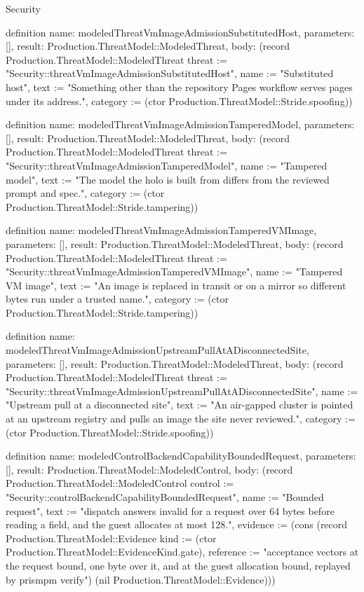\begin{lexlean}{Security}
\begin{semanticmodule}
definition{
  name: modeledThreatVmImageAdmissionSubstitutedHost,
  parameters: [],
  result: Production.ThreatModel::ModeledThreat,
  body: (record Production.ThreatModel::ModeledThreat {threat := "Security::threatVmImageAdmissionSubstitutedHost", name := "Substituted host", text := "Something other than the repository Pages workflow serves pages under its address.", category := (ctor Production.ThreatModel::Stride.spoofing)})
}

definition{
  name: modeledThreatVmImageAdmissionTamperedModel,
  parameters: [],
  result: Production.ThreatModel::ModeledThreat,
  body: (record Production.ThreatModel::ModeledThreat {threat := "Security::threatVmImageAdmissionTamperedModel", name := "Tampered model", text := "The model the holo is built from differs from the reviewed prompt and spec.", category := (ctor Production.ThreatModel::Stride.tampering)})
}

definition{
  name: modeledThreatVmImageAdmissionTamperedVMImage,
  parameters: [],
  result: Production.ThreatModel::ModeledThreat,
  body: (record Production.ThreatModel::ModeledThreat {threat := "Security::threatVmImageAdmissionTamperedVMImage", name := "Tampered VM image", text := "An image is replaced in transit or on a mirror so different bytes run under a trusted name.", category := (ctor Production.ThreatModel::Stride.tampering)})
}

definition{
  name: modeledThreatVmImageAdmissionUpstreamPullAtADisconnectedSite,
  parameters: [],
  result: Production.ThreatModel::ModeledThreat,
  body: (record Production.ThreatModel::ModeledThreat {threat := "Security::threatVmImageAdmissionUpstreamPullAtADisconnectedSite", name := "Upstream pull at a disconnected site", text := "An air-gapped cluster is pointed at an upstream registry and pulls an image the site never reviewed.", category := (ctor Production.ThreatModel::Stride.spoofing)})
}

definition{
  name: modeledControlBackendCapabilityBoundedRequest,
  parameters: [],
  result: Production.ThreatModel::ModeledControl,
  body: (record Production.ThreatModel::ModeledControl {control := "Security::controlBackendCapabilityBoundedRequest", name := "Bounded request", text := "dispatch answers invalid for a request over 64 bytes before reading a field, and the guest allocates at most 128.", evidence := (cons (record Production.ThreatModel::Evidence {kind := (ctor Production.ThreatModel::EvidenceKind.gate), reference := "acceptance vectors at the request bound, one byte over it, and at the guest allocation bound, replayed by prismpm verify"}) (nil Production.ThreatModel::Evidence))})
}


\end{semanticmodule}
\end{lexlean}
